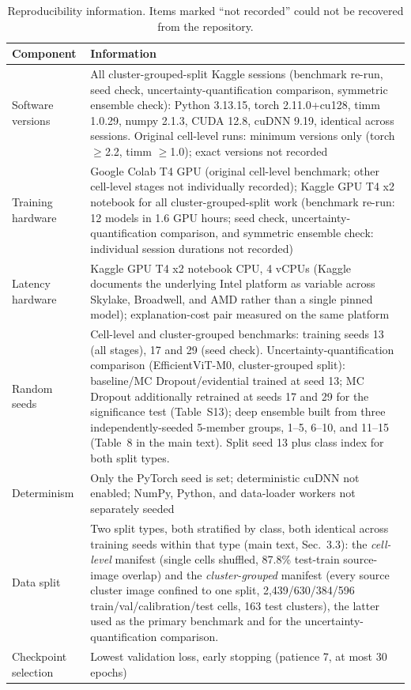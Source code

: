 \documentclass[12pt,letterpaper]{article}
\begin{document}
\begin{table}[htbp]
\centering
\caption{Reproducibility information. Items marked ``not recorded'' could not be recovered from the repository.}
\label{tab:repro}
\footnotesize
\begin{tabular}{@{}p{3.4cm}p{10.2cm}@{}}
\toprule
Component & Information \\
\midrule
Software versions & All cluster-grouped-split Kaggle sessions (benchmark re-run, seed check, uncertainty-quantification comparison, symmetric ensemble check): Python 3.13.15, torch 2.11.0+cu128, timm 1.0.29, numpy 2.1.3, CUDA 12.8, cuDNN 9.19, identical across sessions. Original cell-level runs: minimum versions only (torch $\geq$2.2, timm $\geq$1.0); exact versions not recorded \\
Training hardware & Google Colab T4 GPU (original cell-level benchmark; other cell-level stages not individually recorded); Kaggle GPU T4 x2 notebook for all cluster-grouped-split work (benchmark re-run: 12 models in 1.6 GPU hours; seed check, uncertainty-quantification comparison, and symmetric ensemble check: individual session durations not recorded) \\
Latency hardware & Kaggle GPU T4 x2 notebook CPU, 4 vCPUs (Kaggle documents the underlying Intel platform as variable across Skylake, Broadwell, and AMD rather than a single pinned model); explanation-cost pair measured on the same platform \\
Random seeds & Cell-level and cluster-grouped benchmarks: training seeds 13 (all stages), 17 and 29 (seed check). Uncertainty-quantification comparison (EfficientViT-M0, cluster-grouped split): baseline/MC Dropout/evidential trained at seed 13; MC Dropout additionally retrained at seeds 17 and 29 for the significance test (Table~S13); deep ensemble built from three independently-seeded 5-member groups, 1--5, 6--10, and 11--15 (Table~8 in the main text). Split seed 13 plus class index for both split types. \\
Determinism & Only the PyTorch seed is set; deterministic cuDNN not enabled; NumPy, Python, and data-loader workers not separately seeded \\
Data split & Two split types, both stratified by class, both identical across training seeds within that type (main text, Sec.~3.3): the \emph{cell-level} manifest (single cells shuffled, 87.8\% test-train source-image overlap) and the \emph{cluster-grouped} manifest (every source cluster image confined to one split, 2,439/630/384/596 train/val/calibration/test cells, 163 test clusters), the latter used as the primary benchmark and for the uncertainty-quantification comparison. \\
Checkpoint selection & Lowest validation loss, early stopping (patience 7, at most 30 epochs) \\
\bottomrule
\end{tabular}
\end{table}
\end{document}
